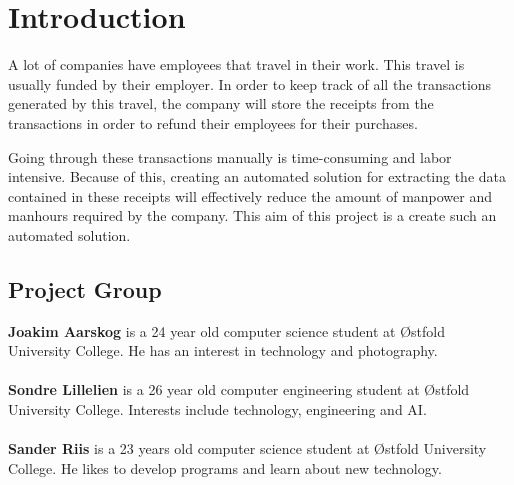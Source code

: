 \chapter{Introduction}
\label{ch:intro}
A lot of companies have employees that travel in their work.
This travel is usually funded by their employer.
In order to keep track of all the transactions generated by this travel, the company will store the receipts from the transactions in order to refund their employees for their purchases.

Going through these transactions manually is time-consuming and labor intensive.
Because of this, creating an automated solution for extracting the data contained in these receipts will effectively reduce the amount of manpower and manhours required by the company.
This aim of this project is a create such an automated solution.
\section{Project Group}\label{sec:project-group}

\textbf{Joakim Aarskog} is a 24 year old computer science student at Østfold University College.
He has an interest in technology and photography.\\
\\
\textbf{Sondre Lillelien} is a 26 year old computer engineering student at Østfold University College.
Interests include technology, engineering and AI.\\
\\
\textbf{Sander Riis} is a 23 years old computer science student at Østfold University College.
He likes to develop programs and learn about new technology.


